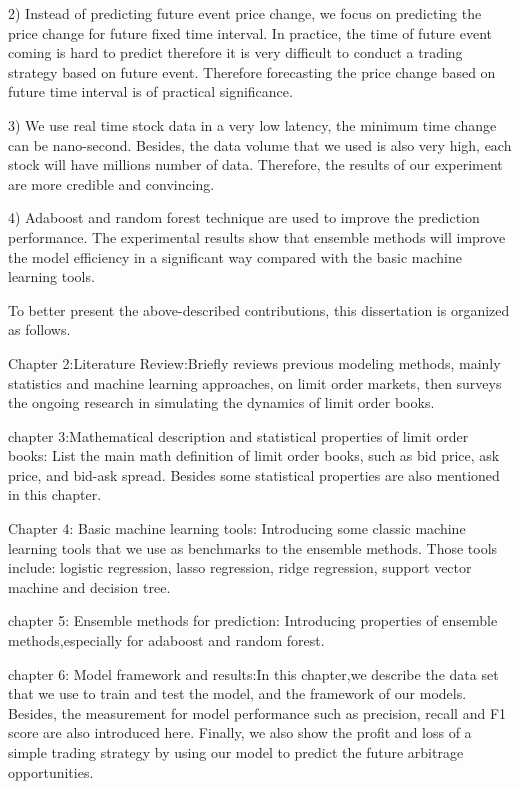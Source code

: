 2) Instead of predicting future event price change, we focus on predicting the price change for future fixed time interval. In practice, the time of future event coming is hard to predict therefore it is very difficult to conduct a trading strategy based on future event. Therefore forecasting the price change based on future time interval is of practical significance.

3) We use real time stock data in a very low latency, the minimum time change can be nano-second. Besides, the data volume that we used is also very high, each stock will have millions number of data. Therefore, the results of our experiment are more credible and convincing.  

4) Adaboost and random forest technique are used to improve the prediction performance. The experimental results show that ensemble methods will improve the model efficiency in a significant way compared with the basic machine learning tools.

To better present the above-described contributions, this dissertation is organized as follows. 

Chapter 2:Literature Review:Briefly reviews previous modeling methods,
mainly statistics and machine learning approaches, on limit order markets, then surveys the
ongoing research in simulating the dynamics of limit order books.

chapter 3:Mathematical description and statistical properties of limit order books: List the main math definition of limit order books, such as bid price, ask price, and bid-ask spread. 
Besides some statistical properties are also mentioned in this chapter.  

Chapter 4: Basic machine learning tools: Introducing some classic machine learning tools that we use as benchmarks to the ensemble methods. Those tools include: logistic regression, lasso regression, ridge regression, support vector machine and decision tree. 

chapter 5: Ensemble methods for prediction:  Introducing properties of ensemble methods,especially for adaboost and random forest. 

chapter 6: Model framework and results:In this chapter,we describe the data set that we use to train and test the model,  and the framework of our models. Besides, the measurement for model performance such as precision, recall and F1 score are also introduced here. Finally, we also show the profit and loss of a simple trading strategy by using our model to predict the future arbitrage opportunities. 

